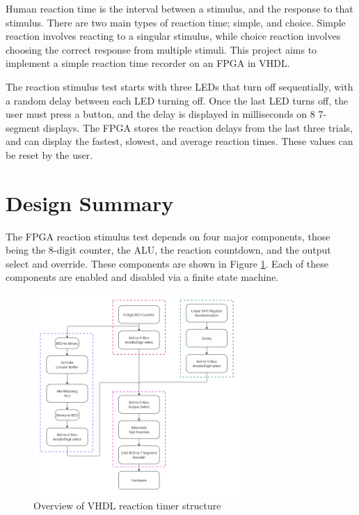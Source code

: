 \documentclass[11pt]{article}
\begin{document}
Human reaction time is the interval between a stimulus, and the response to that stimulus. There are two main types of reaction time; simple, and choice. Simple reaction involves reacting to a singular stimulus, while choice reaction involves choosing the correct response from multiple stimuli. This project aims to implement a simple reaction time recorder on an FPGA in VHDL.

The reaction stimulus test starts with three LEDs that turn off sequentially, with a random delay between each LED turning off. Once the last LED turns off, the user must press a button, and the delay is displayed in milliseconds on 8 7-segment displays. The FPGA stores the reaction delays from the last three trials, and can display the fastest, slowest, and average reaction times. These values can be reset by the user.

\section{Design Summary}

The FPGA reaction stimulus test depends on four major components, those being the 8-digit counter, the ALU, the reaction countdown, and the output select and override. These components are shown in Figure \ref{project_structure}. Each of these components are enabled and disabled via a finite state machine.

\begin{figure}[H]
  \centering
  \includegraphics[width=0.7\textwidth]{project_overall_structure.png}
  \caption{Overview of VHDL reaction timer structure}
  \label{project_structure}
\end{figure}
\end{document}
